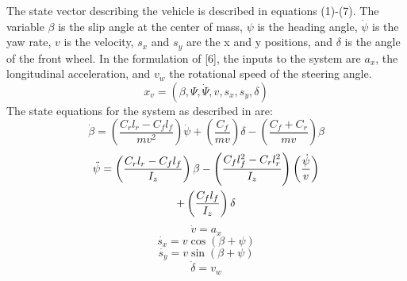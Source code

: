 \documentclass{easychair}
\theoremstyle{theorem}
\theoremstyle{remark}
\begin{document}
The state vector describing the vehicle is described in equations (1)-(7). 
The variable \(\beta\) is the slip angle at the center of mass, \(\psi\) is the heading angle, \(\dot{\psi}\) is the yaw rate, \(v\) is the velocity, \(s_x\) and \(s_y\) are the x and y positions, and \(\delta\) is the angle of the front wheel. In the formulation of [6], the inputs to the system are \(a_x\), the longitudinal acceleration, and \(v_w\) the rotational speed of the steering angle. 
\begin{equation}
x_v = (\beta,\Psi,\dot{\Psi}, v, s_x, s_y, \delta)
\end{equation}	
The state equations for the system as described in \cite{Althoff2014} are:
\begin{equation}
\label{eqn:beta}
\dot{\beta}=\left(\frac{C_rl_r-C_fl_f}{mv^2} \right)\dot{\psi}+\left(\frac{C_f}{mv} \right)\delta-\left(\frac{C_f+C_r}{mv} \right)\beta
\end{equation}
\begin{gather}
\label{eqn:psi}
\ddot{\psi}=\left(\frac{C_rl_r-C_fl_f}{I_z} \right)\beta-\left(\frac{C_fl_f^2-C_rl_r^2}{I_z} \right)\left(\frac{\dot{\psi}}{v} \right) \notag \\
+\left(\frac{C_fl_f}{I_z} \right)\delta
\end{gather}
\begin{equation}
\label{eqn:v}
\dot{v}=a_x
\end{equation}
\begin{equation}
\label{eqn:sx}
\dot{s_x}=v\cos{(\beta+\psi)}
\end{equation}
\begin{equation}
\label{eqn:sy}
\dot{s_y}=v\sin{(\beta+\psi)}	
\end{equation}	
\begin{equation}
\label{eqn:delta}
\dot{\delta}=v_w
\end{equation}

\end{document}
